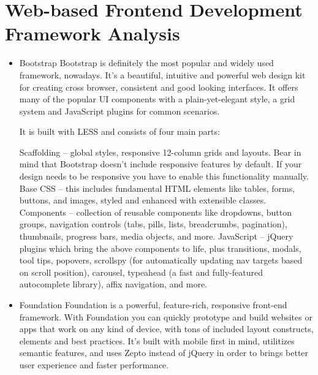 \section{Web-based Frontend Development Framework Analysis}
 \begin{itemize}
\item Bootstrap
\newline
Bootstrap is definitely the most popular and widely used framework, nowadays. It’s a beautiful, intuitive and powerful web design kit for creating cross browser, consistent and good looking interfaces. It offers many of the popular UI components with a plain-yet-elegant style, a grid system and JavaScript plugins for common scenarios.

It is built with LESS and consists of four main parts:

Scaffolding – global styles, responsive 12-column grids and layouts. Bear in mind that Bootstrap doesn’t include responsive features by default. If your design needs to be responsive you have to enable this functionality manually.
Base CSS – this includes fundamental HTML elements like tables, forms, buttons, and images, styled and enhanced with extensible classes.
Components – collection of reusable components like dropdowns, button groups, navigation controls (tabs, pills, lists, breadcrumbs, pagination), thumbnails, progress bars, media objects, and more.
JavaScript – jQuery plugins which bring the above components to life, plus transitions, modals, tool tips, popovers, scrollspy (for automatically updating nav targets based on scroll position), carousel, typeahead (a fast and fully-featured autocomplete library), affix navigation, and more.
\item Foundation
\newline
Foundation is a powerful, feature-rich, responsive front-end framework. With Foundation you can quickly prototype and build websites or apps that work on any kind of device, with tons of included layout constructs, elements and best practices. It’s built with mobile first in mind, utilitizes semantic features, and uses Zepto instead of jQuery in order to brings better user experience and faster performance.


\end{itemize}
